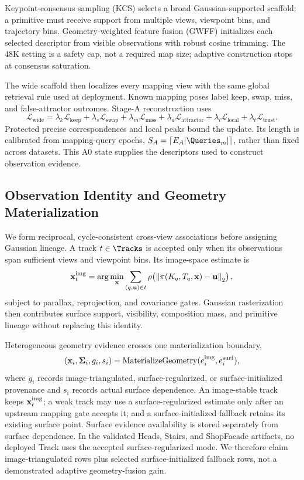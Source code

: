 Keypoint-consensus sampling (KCS) selects a broad Gaussian-supported scaffold:
a primitive must receive support from multiple views, viewpoint bins, and
trajectory bins. Geometry-weighted feature fusion (GWFF) initializes each
selected descriptor from visible observations with robust cosine trimming. The
48K setting is a safety cap, not a required map size; adaptive construction
stops at consensus saturation.

The wide scaffold then localizes every mapping view with the same global
retrieval rule used at deployment. Known mapping poses label keep, swap, miss,
and false-attractor outcomes. Stage-A reconstruction uses
\begin{equation}
  \mathcal{L}_{\mathrm{wide}} =
  \lambda_k\mathcal{L}_{\mathrm{keep}}+
  \lambda_s\mathcal{L}_{\mathrm{swap}}+
  \lambda_m\mathcal{L}_{\mathrm{miss}}+
  \lambda_a\mathcal{L}_{\mathrm{attractor}}+
  \lambda_l\mathcal{L}_{\mathrm{local}}+
  \lambda_t\mathcal{L}_{\mathrm{trust}}.
\end{equation}
Protected precise correspondences and local peaks bound the update. Its length
is calibrated from mapping-query epochs,
$S_A=\lceil E_A|\Queries_m|\rceil$, rather than fixed across datasets. This A0
state supplies the descriptors used to construct observation evidence.

\subsection{Observation Identity and Geometry Materialization}

We form reciprocal, cycle-consistent cross-view associations before assigning
Gaussian lineage. A track $t\in\Tracks$ is accepted only when its observations
span sufficient views and viewpoint bins. Its image-space estimate is
\begin{equation}
  \mathbf{x}_{t}^{\rm img}=
  \arg\min_{\mathbf{x}}\sum_{(q,\mathbf{u})\in t}
  \rho\!\left(\left\|\pi(K_q,T_q,\mathbf{x})-
  \mathbf{u}\right\|_2\right),
\end{equation}
subject to parallax, reprojection, and covariance gates. Gaussian
rasterization then contributes surface support, visibility, composition mass,
and primitive lineage without replacing this identity.

Heterogeneous geometry evidence crosses one materialization boundary,
\begin{equation}
 (\mathbf{x}_i,\mathbf\Sigma_i,g_i,s_i)=
 \operatorname{MaterializeGeometry}(e_i^{\rm img},e_i^{\rm surf}),
\end{equation}
where $g_i$ records image-triangulated, surface-regularized, or
surface-initialized provenance and $s_i$ records actual surface dependence.
An image-stable track keeps $\mathbf{x}_{t}^{\rm img}$; a weak track may use a
surface-regularized estimate only after an upstream mapping gate accepts it;
and a surface-initialized fallback retains its existing surface point. Surface
evidence availability is stored separately from surface dependence. In the
validated Heads, Stairs, and ShopFacade artifacts, no deployed Track uses the
accepted surface-regularized mode. We therefore claim image-triangulated rows
plus selected surface-initialized fallback rows, not a demonstrated adaptive
geometry-fusion gain.

